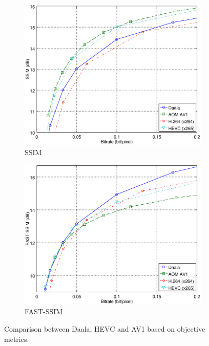 \documentclass[english,conference,10pt]{IEEEtran}
\begin{document}
\begin{figure}
\begin{subfigure}[t]{0.5\textwidth}
\includegraphics[width=\columnwidth]{ssim.eps}
\caption{SSIM}
\end{subfigure}\begin{subfigure}[t]{0.5\textwidth}
\includegraphics[width=\columnwidth]{fastssim.eps}
\caption{FAST-SSIM}
\end{subfigure}
\caption{Comparison between Daala, HEVC and AV1 based on objective metrics.}\label{fig:metrics}
\end{figure}
\end{document}

